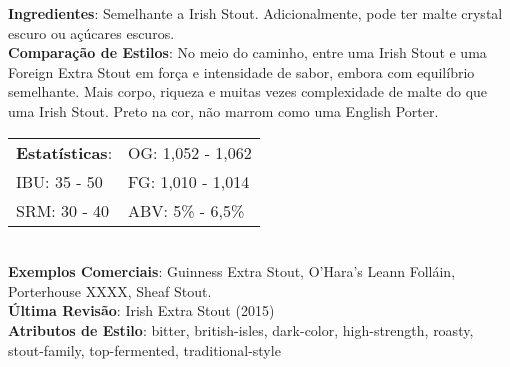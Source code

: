 \textbf{Ingredientes}: Semelhante a Irish Stout. Adicionalmente, pode ter malte crystal escuro ou açúcares escuros. \\
\textbf{Comparação de Estilos}: No meio do caminho, entre uma Irish Stout e uma Foreign Extra Stout em força e intensidade de sabor, embora com equilíbrio semelhante. Mais corpo, riqueza e muitas vezes complexidade de malte do que uma Irish Stout. Preto na cor, não marrom como uma English Porter. \\
\begin{tabular}{@{}p{35mm}p{35mm}@{}}
  \textbf{Estatísticas}: & OG: 1,052 - 1,062 \\
  IBU: 35 - 50  & FG: 1,010 - 1,014 \\
  SRM: 30 - 40  & ABV: 5\% - 6,5\%
\end{tabular}\\
\textbf{Exemplos Comerciais}: Guinness Extra Stout, O'Hara's Leann Folláin, Porterhouse XXXX, Sheaf Stout. \\
\textbf{Última Revisão}: Irish Extra Stout (2015) \\
\textbf{Atributos de Estilo}: bitter, british-isles, dark-color, high-strength, roasty, stout-family, top-fermented, traditional-style
